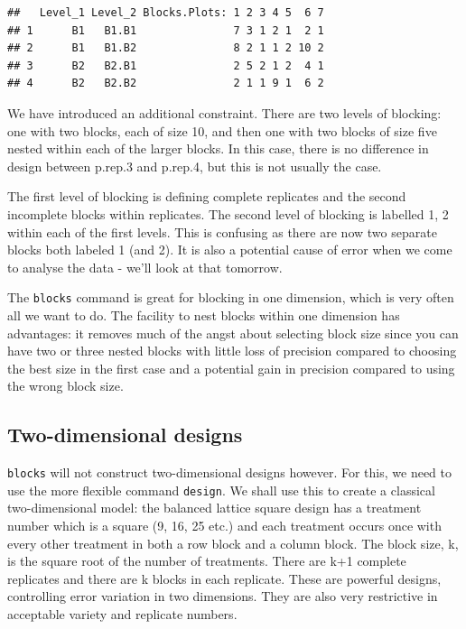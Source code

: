 \documentclass[
]{book}
\begin{document}
\begin{verbatim}
##   Level_1 Level_2 Blocks.Plots: 1 2 3 4 5  6 7
## 1      B1   B1.B1               7 3 1 2 1  2 1
## 2      B1   B1.B2               8 2 1 1 2 10 2
## 3      B2   B2.B1               2 5 2 1 2  4 1
## 4      B2   B2.B2               2 1 1 9 1  6 2
\end{verbatim}

We have introduced an additional constraint. There are two levels of blocking: one with two blocks, each of size 10, and then one with two blocks of size five nested within each of the larger blocks. In this case, there is no difference in design between p.rep.3 and p.rep.4, but this is not usually the case.

The first level of blocking is defining complete replicates and the second incomplete blocks within replicates. The second level of blocking is labelled 1, 2 within each of the first levels. This is confusing as there are now two separate blocks both labeled 1 (and 2). It is also a potential cause of error when we come to analyse the data - we'll look at that tomorrow.

The \texttt{blocks} command is great for blocking in one dimension, which is very often all we want to do. The facility to nest blocks within one dimension has advantages: it removes much of the angst about selecting block size since you can have two or three nested blocks with little loss of precision compared to choosing the best size in the first case and a potential gain in precision compared to using the wrong block size.

\hypertarget{two-dimensional-designs}{%
\subsection{Two-dimensional designs}\label{two-dimensional-designs}}

\texttt{blocks} will not construct two-dimensional designs however. For this, we need to use the more flexible command \texttt{design}. We shall use this to create a classical two-dimensional model: the balanced lattice square design has a treatment number which is a square (9, 16, 25 etc.) and each treatment occurs once with every other treatment in both a row block and a column block. The block size, k, is the square root of the number of treatments. There are k+1 complete replicates and there are k blocks in each replicate. These are powerful designs, controlling error variation in two dimensions. They are also very restrictive in acceptable variety and replicate numbers.
\end{document}
